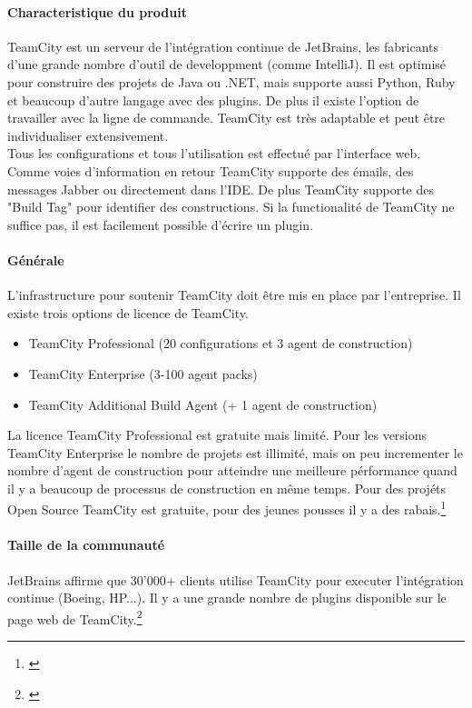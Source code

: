 \paragraph{Characteristique du produit} TeamCity est un serveur de l'intégration continue de JetBrains, les fabricants d'une grande nombre d'outil de developpment (comme IntelliJ). Il est optimisé pour construire des projets de Java ou .NET, mais supporte aussi Python, Ruby et beaucoup d'autre langage avec des plugins. De plus il existe l'option de travailler avec la ligne de commande. TeamCity est très adaptable et peut être individualiser extensivement. \\
Tous les configurations et tous l'utilisation est effectué par l'interface web. Comme voies d'information en retour TeamCity supporte des émails, des messages Jabber ou directement dans l'IDE. De plus TeamCity supporte des "Build Tag" pour identifier des constructions. Si la functionalité de TeamCity ne suffice pas, il est facilement possible d'écrire un plugin.

\paragraph{Générale} L'infrastructure pour soutenir TeamCity doit être mis en place par l'entreprise. Il existe trois options de licence de TeamCity.
\begin{itemize}
	\item TeamCity Professional (20 configurations et 3 agent de construction)
	\item TeamCity Enterprise (3-100 agent packs)
	\item TeamCity Additional Build Agent (+ 1 agent de construction)
\end{itemize}
La licence TeamCity Professional est gratuite mais limité. Pour les versions TeamCity Enterprise le nombre de projets est illimité, mais on peu incrementer le nombre d'agent de construction pour atteindre une meilleure pérformance quand il y a beaucoup de processus de construction en même temps. Pour des projéts Open Source TeamCity est gratuite, pour des jeunes pousses il y a des rabais.\footnote{\citep{teamcitybuy}}
\paragraph{Taille de la communauté}
JetBrains affirme que 30'000+ clients utilise TeamCity pour executer l'intégration continue (Boeing, HP...). Il y a une grande nombre de plugins disponible sur le page web de TeamCity.\footnote{\citep{teamcityplugins}}
